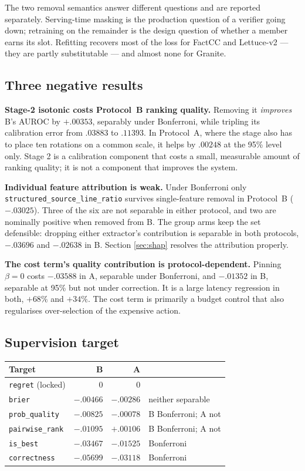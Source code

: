 \documentclass[10pt,a4paper]{article}
\begin{document}
The two removal semantics answer different questions and are reported separately. Serving-time
masking is the production question of a verifier going down; retraining on the remainder is the
design question of whether a member earns its slot. Refitting recovers most of the loss for
FactCC and Lettuce-v2 --- they are partly substitutable --- and almost none for Granite.

\subsection{Three negative results}

\textbf{Stage-2 isotonic costs Protocol~B ranking quality.} Removing it \emph{improves} B's AUROC
by $+.00353$, separably under Bonferroni, while tripling its calibration error from $.03883$ to
$.11393$. In Protocol~A, where the stage also has to place ten rotations on a common scale, it
helps by $.00248$ at the 95\% level only. Stage 2 is a calibration component that costs a small,
measurable amount of ranking quality; it is not a component that improves the system.

\textbf{Individual feature attribution is weak.} Under Bonferroni only
\texttt{structured\_source\_line\_ratio} survives single-feature removal in Protocol~B
($-.03025$). Three of the six are not separable in either protocol, and two are nominally
positive when removed from B. The group arms keep the set defensible: dropping either
extractor's contribution is separable in both protocols, $-.03696$ and $-.02638$ in B. Section
\ref{sec:shap} resolves the attribution properly.

\textbf{The cost term's quality contribution is protocol-dependent.} Pinning $\beta=0$ costs
$-.03588$ in A, separable under Bonferroni, and $-.01352$ in B, separable at 95\% but not under
correction. It is a large latency regression in both, $+68\%$ and $+34\%$. The cost term is
primarily a budget control that also regularises over-selection of the expensive action.

\subsection{Supervision target}

\begin{center}\small
\begin{tabular}{lrrl}
\toprule
Target & B & A & \\
\midrule
\texttt{regret} (locked) & 0 & 0 & \\
\texttt{brier} & $-.00466$ & $-.00286$ & neither separable \\
\texttt{prob\_quality} & $-.00825$ & $-.00078$ & B Bonferroni; A not \\
\texttt{pairwise\_rank} & $-.01095$ & $+.00106$ & B Bonferroni; A not \\
\texttt{is\_best} & $-.03467$ & $-.01525$ & Bonferroni \\
\texttt{correctness} & $-.05699$ & $-.03118$ & Bonferroni \\
\bottomrule
\end{tabular}
\end{center}
\end{document}
